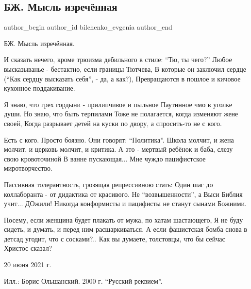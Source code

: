  
 
 
 
 
 
\subsection{БЖ. Мысль изречённая}
\label{sec:20_06_2021.fb.bilchenko_evgenia.2.mysl_izrechennaja}
\ifcmt
 author_begin
   author_id bilchenko_evgenia
 author_end
\fi

БЖ. Мысль изречённая.

И сказать нечего, кроме трюизма дебильного в стиле: \enquote{Тю, ты чего?}
Любое высказыванье - бестактно, если границы Тютчева,
В которые он заключил сердце (\enquote{Как сердцу высказать себя}, - да, а как?),
Превращаются в пошлое и кичовое кухонное поддакивание.

Я знаю, что грех гордыни - прилипчивое и пыльное
Паутинное чмо в уголке души. Но знаю, что быть терпилами 
Тоже не полагается, когда изменяют жене своей,
Когда разрывает детей на куски по двору, а спросить-то не с кого.

Есть с кого. Просто боязно. Они говорят: \enquote{Политика}.
Школа молчит, и жена молчит, и церковь молчит, и критика.
А это - мертвый ребёнок и баба, слезу свою кровоточиной
В ванне пускающая... Мне чуждо пацифистское миротворчество.

Пассивная толерантность, грозящая репрессивною стать:
Один шаг до коллаборанта - от дидактика от красивого.
Не \enquote{возвышенности}, а Выси Библия учит...  ДОжили!
Никогда конформисты и пацифисты не станут сынами Божиими.

Посему, если женщина будет плакать от мужа, по хатам шастающего,
Я не буду сидеть, и думать, и перед ним расшаркиваться.
А если фашистская бомба снова в детсад угодит, что с сосками?..
Как вы думаете, толстовцы, что бы сейчас Христос сказал?

20 июня 2021 г.

Илл.: Борис Ольшанский. 2000 г. \enquote{Русский реквием}.


